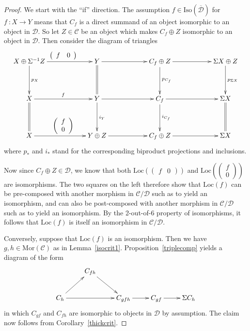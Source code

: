 \documentclass{amsproc}
\theoremstyle{definition}
\begin{document}
\begin{proof}
We start with the ``if'' direction. The assumption $f\in{\mathrm{Iso}}(\overline{\mathcal{D}})$ for $f\: : X{\longrightarrow} Y$ means that $C_f$ is a direct summand of an object isomorphic to an object in ${\mathcal{D}}$. So let $Z\in{\mathcal{C}}$ be an object which makes $C_f\oplus Z$ isomorphic to an object in ${\mathcal{D}}$. Then consider the diagram of triangles
\[
\xymatrix@C+33pt@R+15pt{ X\oplus \Sigma^{-1}Z \ar[r]^{\left(\begin{array}{cc}f & 0\end{array}\right)} \ar[d]^{p_X} & Y \ar[r] \ar@{=}[d] & C_f\oplus Z \ar[d]^{p_{C_f}} \ar[r] & \Sigma X\oplus Z \ar[d]^{p_{\Sigma X}} \\
	X \ar[r]^f \ar@{=}[d] & Y \ar[r] \ar[d]^{i_Y} & C_f \ar[r] \ar[d]^{i_{C_f}} & \Sigma X \ar@{=}[d] \\
	X \ar[r]^{\left(\begin{array}{c}f\\ 0\end{array}\right)} & Y\oplus Z \ar[r] & C_f \oplus Z \ar[r] & \Sigma X }
\]
where $p_\ast$ and $i_\ast$ stand for the corresponding biproduct projections and inclusions.

Now since $C_f\oplus Z\in{\mathcal{D}}$, we know that both ${\mathrm{Loc}}\left(\left(\begin{array}{cc}f & 0\end{array}\right)\right)$ and ${\mathrm{Loc}}\left(\left(\begin{array}{c}f\\ 0\end{array}\right)\right)$ are isomorphisms. The two squares on the left therefore show that ${\mathrm{Loc}}(f)$ can be pre-composed with another morphism in ${\mathcal{C}}/{\mathcal{D}}$ such as to yield an isomorphism, and can also be post-composed with another morphism in ${\mathcal{C}}/{\mathcal{D}}$ such as to yield an isomorphism. By the 2-out-of-6 property of isomorphisms, it follows that ${\mathrm{Loc}}(f)$ is itself an isomorphism in ${\mathcal{C}}/{\mathcal{D}}$.

Conversely, suppose that ${\mathrm{Loc}}(f)$ is an isomorphism. Then we have $g,h\in{\mathrm{Mor}}({\mathcal{C}})$ as in Lemma~\ref{isocrit1}. Proposition~\ref{triplecomp} yields a diagram of the form
\[
\xymatrix{ & C_{fh} \ar[dr] \\
C_{h} \ar[ur] \ar[rr] & & C_{gfh} \ar[r] & C_{gf} \ar[r] & \Sigma C_h }
\]
in which $C_{gf}$ and $C_{fh}$ are isomorphic to objects in ${\mathcal{D}}$ by assumption. The claim now follows from Corollary~\ref{thickcrit}.
\end{proof}
\end{document}
